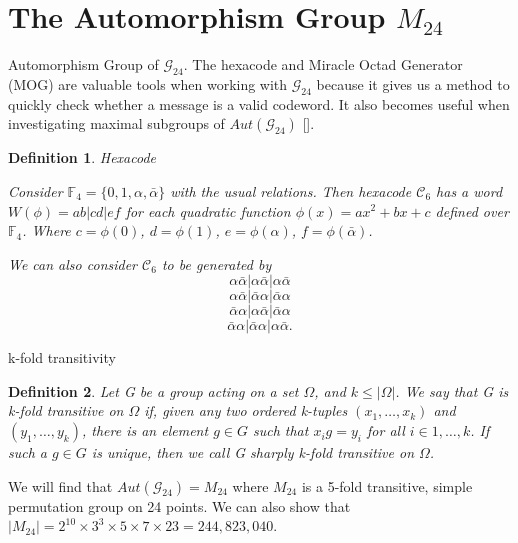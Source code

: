 \documentclass[paper=a4, fontsize=11pt]{scrartcl} %
\numberwithin{equation}{section} %
\numberwithin{figure}{section} %
\numberwithin{table}{section} %
\newtheorem{defn}{Definition}
\begin{document}
\section{The Automorphism Group $M_{24}$}
\begin{outline}[enumerate]
   \1 Automorphism Group of $\mathcal{G}_{24}$.       
       \2 The hexacode and Miracle Octad Generator (MOG) are valuable tools when working with $\mathcal{G}_{24}$ because it gives us a method to quickly check whether a message is a valid codeword. It also becomes useful when investigating maximal subgroups of $Aut(\mathcal{G}_{24})$ [\cite{conway}].

       \begin{defn}{Hexacode}

        Consider $\mathbb{F}_4 = \{0,1,\alpha,\bar{\alpha}\}$ with the usual relations.
        Then hexacode $\mathcal{C}_6$ has a word $W(\phi) = ab|cd|ef$ for each quadratic function $\phi(x) = ax^2 + bx + c$ defined over $\mathbb{F}_4$. Where $c=\phi(0)$, $d=\phi(1)$, $e=\phi(\alpha)$, $f=\phi(\bar{\alpha})$.

        We can also consider $\mathcal{C}_6$ to be generated by 
        $$\alpha\bar{\alpha}|\alpha\bar{\alpha}|\alpha\bar{\alpha}$$
        $$\alpha\bar{\alpha}|\bar{\alpha}\alpha|\bar{\alpha}\alpha$$
        $$\bar{\alpha}\alpha|\alpha\bar{\alpha}|\bar{\alpha}\alpha$$
        $$\bar{\alpha}\alpha|\bar{\alpha}\alpha|\alpha\bar{\alpha}.$$
       \end{defn}
       \2 k-fold transitivity
          \begin{defn}
             Let G be a group acting on a set $\Omega$, and $k \leq |\Omega|$. We say that G is k-fold transitive on $\Omega$ if, given any two ordered k-tuples $(x_1, \ldots, x_k)$ and $(y_1, \ldots, y_k)$, there is an element $g \in G$ such that $x_ig = y_i$ for all $i \in {1, \ldots, k}$. If such a $g \in G$ is unique, then we call G sharply k-fold transitive on $\Omega$.
          \end{defn}
       \2 We will find that $Aut(\mathcal{G}_{24}) = M_{24}$ where $M_{24}$ is a 5-fold transitive, simple permutation group on 24 points. We can also show that $|M_{24}| = 2^{10} \times 3^3 \times 5 \times 7 \times 23 = 244,823,040$.

\end{outline}
\clearpage
\printbibliography
\end{document}
